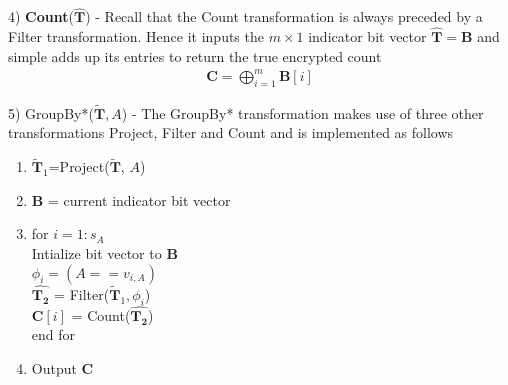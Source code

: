 4) \textbf{\textsf{Count}}($\mathbf{\hat{T}}$) - Recall that the \textsf{Count} transformation is always preceded by a \textsf{Filter} transformation. Hence it inputs the $m \times 1$ indicator bit vector $\mathbf{\hat{T}}=\mathbf{B}$ and simple adds up its entries to return the true encrypted count  \begin{gather}\mathbf{C}=\bigoplus_{i=1}^m\mathbf{B}[i]\end{gather}%


5) \textsf{GroupBy*}($\mathbf{\tilde{T}},A$) - The \textsf{GroupBy*} transformation   makes use of three other transformations \textsf{Project, Filter} and \textsf{Count} and is implemented as follows
\begin{enumerate}[label=\alph*)] \item $\mathbf{\tilde{T}}_1$=\textsf{Project}($\mathbf{\tilde{T}}$, $A$) \item $\mathbf{B}$ =  current indicator bit vector \item  for $i = 1:s_A $ \\Intialize bit vector to $\mathbf{B}$  \\$\phi_i= (A==v_{i,A}) $ \\$\hat{\mathbf{T_2}}$ = \textsf{Filter}($\mathbf{\tilde{T}}_1, \phi_i$)\\ $\mathbf{C}[i]$ = \textsf{Count}($\hat{\mathbf{T_2}}$) \\ end for \item Output $\mathbf{C}$ 
\end{enumerate}


